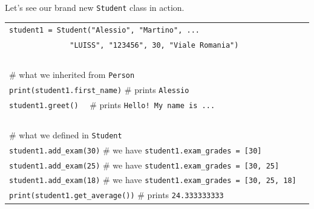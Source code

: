 \documentclass[t,handout,9pt]{beamer}
\begin{document}
\begin{frame}
\vfill
Let's see our brand new \texttt{Student} class in action.
\begin{table}[]
\begin{flushleft}
\begin{tabular}{ll}
\texttt{student1 = Student("Alessio", "Martino", ... } &  \\
\texttt{\ \ \ \ \ \ \ \ \ \ \ \ \ \ "LUISS", "123456", 30, "Viale Romania")} &  \\
\texttt{ } &  \\
\# what we inherited from \texttt{Person} &  \\
\texttt{print(student1.first\_name)} \qquad \# prints \texttt{Alessio}&\\
\texttt{student1.greet()} \qquad\quad\quad\quad\quad \ \ \# prints \texttt{Hello! My name is ...} & \\
\texttt{ } &  \\
\# what we defined in \texttt{Student} &  \\
\texttt{student1.add\_exam(30)} \qquad \# we have \texttt{student1.exam\_grades = [30]} &  \\
\texttt{student1.add\_exam(25)} \qquad \# we have \texttt{student1.exam\_grades = [30, 25]} &  \\
\texttt{student1.add\_exam(18)} \qquad \# we have \texttt{student1.exam\_grades = [30, 25, 18]} &  \\
\texttt{print(student1.get\_average())} \quad \# prints \texttt{24.333333333} &  \\
\end{tabular}
\end{flushleft}
\end{table}
\vfill
\end{frame}
\end{document}
